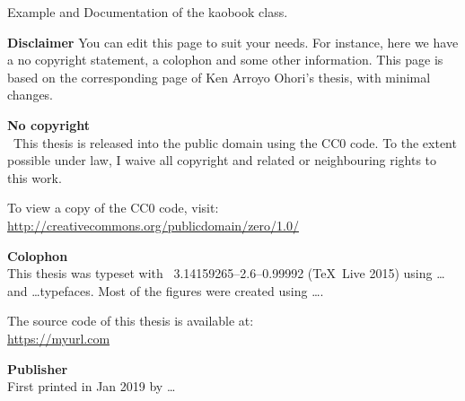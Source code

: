 \thispagestyle{empty}
\label{page:colophon}

\null%
\vfill
Example and Documentation of the kaobook class.\\
{\makeatletter
\href{http://mywebsite.com}{\@author}%
\makeatother}

\textbf{Disclaimer}
You can edit this page to suit your needs. For instance, here we have a 
no copyright statement, a colophon and some other information. This page 
is based on the corresponding page of Ken Arroyo Ohori's thesis, with 
minimal changes.

\textbf{No copyright}\\
\cczero\ This thesis is released into the public domain using the CC0 code.
To the extent possible under law, I waive all copyright and related or neighbouring rights to this work.

To view a copy of the CC0 code, visit: \\
\url{http://creativecommons.org/publicdomain/zero/1.0/}

\textbf{Colophon} \\
This thesis was typeset with \XeTeX\ 3.14159265--2.6--0.99992 (\TeX\ 
Live 2015) using \ldots and \ldots typefaces.
Most of the figures were created using \ldots.

The source code of this thesis is available at: \\
\url{https://myurl.com}

\textbf{Publisher} \\
First printed in Jan 2019 by \ldots
